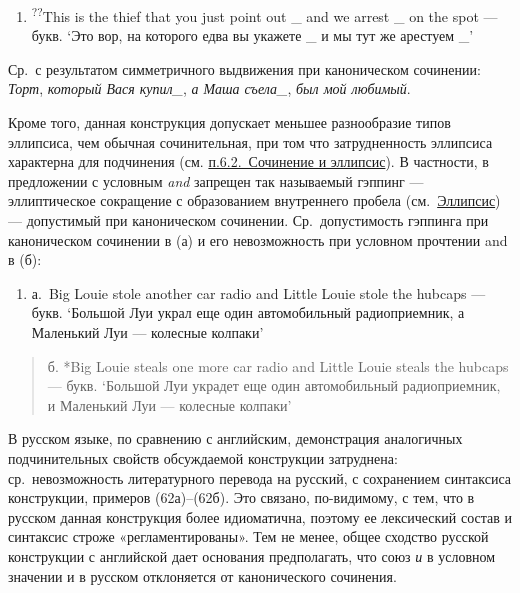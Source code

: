 \begin{enumerate}
\def\labelenumi{(\arabic{enumi})}
\setcounter{enumi}{60}
\item
  \textsuperscript{??}This is the thief that you just point out \_ and
  we arrest \_ on the spot --- букв. `Это вор, на которого едва вы
  укажете \_ и мы тут же арестуем \_'
\end{enumerate}

Ср.~с результатом симметричного выдвижения при каноническом сочинении:
\textit{Торт}, \textit{который Вася купил\_}, \textit{а Маша съела\_},
\textit{был мой любимый}.

Кроме того, данная конструкция допускает меньшее разнообразие типов
эллипсиса, чем обычная сочинительная, при том что затрудненность
эллипсиса характерна для подчинения (см. \underline{п.6.2.~Сочинение и
эллипсис}). В частности, в предложении с условным \textit{and} запрещен
так называемый гэппинг --- эллиптическое сокращение с образованием
внутреннего пробела (см.~\underline{Эллипсис}) --- допустимый при
каноническом сочинении. Ср.~допустимость гэппинга при каноническом
сочинении в (а) и его невозможность при условном прочтении and в (б):

\begin{enumerate}
\def\labelenumi{(\arabic{enumi})}
\setcounter{enumi}{61}
\item
  а.~Big Louie stole another car radio and Little Louie stole the
  hubcaps --- букв. `Большой Луи украл еще один автомобильный
  радиоприемник, а Маленький Луи --- колесные колпаки'
\end{enumerate}

\begin{quote}
б. *Big Louie steals one more car radio and Little Louie steals the
hubcaps --- букв. `Большой Луи украдет еще один автомобильный
радиоприемник, и Маленький Луи --- колесные колпаки'
\end{quote}

В русском языке, по сравнению с английским, демонстрация аналогичных
подчинительных свойств обсуждаемой конструкции затруднена:
ср.~невозможность литературного перевода на русский, с сохранением
синтаксиса конструкции, примеров (62а)--(62б). Это связано, по-видимому,
с тем, что в русском данная конструкция более идиоматична, поэтому ее
лексический состав и синтаксис строже «регламентированы». Тем не менее,
общее сходство русской конструкции с английской дает основания
предполагать, что союз \textit{и} в условном значении и в русском
отклоняется от канонического сочинения.

